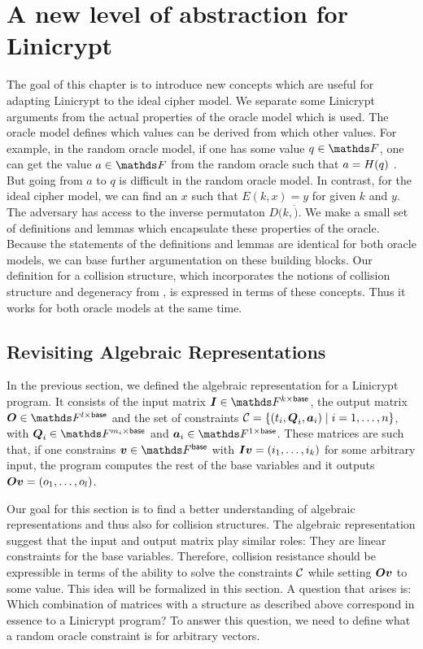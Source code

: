 \chapter{A new level of abstraction for Linicrypt}

The goal of this chapter is to introduce new concepts which are useful for adapting Linicrypt to the ideal cipher model.
We separate some Linicrypt arguments from the actual properties of the oracle model which is used.
The oracle model defines which values can be derived from which other values.
For example, in the random oracle model, if one has some value $q \in \F$, one can get the value $a \in \F$ from the random oracle such that $a = H(q)$ .
But going from $a$ to $q$ is difficult in the random oracle model.
In contrast, for the ideal cipher model, we can find an $x$ such that $E(k,x) = y$ for given $k$ and $y$.
The adversary has access to the inverse permutaton $D(k, \ddot)$.
We make a small set of definitions and lemmas which encapsulate these properties of the oracle.
Because the statements of the definitions and lemmas are identical for both oracle models,
we can base further argumentation on these building blocks.
Our definition for a collision structure,
which incorporates the notions of collision structure and degeneracy from \cite{TCC:McQSwoRos19},
is expressed in terms of these concepts.
Thus it works for both oracle models at the same time.

\section{Revisiting Algebraic Representations}
\label{chapter:revisiting_algebraic_representations}

In the previous section, we defined the algebraic representation for a Linicrypt program.
It consists of the input matrix $\Inp \in \F^{k \times \base}$,
the output matrix $\O \in \F^{l \times \base}$
and the set of constraints $\mathcal{C} = \{ (t_i, \boldsymbol{Q}_i, \boldsymbol a_i) \mid i = 1, \dots, n \}$,
with $\Q_i \in \F^{m_i \times \base}$ and $\va_i \in \F^{1 \times \base}$.
These matrices are such that,
if one constrains $\vbase \in \Fsp$ with $\boldsymbol{I}\boldsymbol v = (i_1, \dots, i_{k})$ for some arbitrary input,
the program computes the rest of the base variables and it outputs $\boldsymbol{O} \boldsymbol v = (o_1, \dots, o_{l})$.

Our goal for this section is to find a better understanding of algebraic representations and thus also for collision structures.
The algebraic representation suggest
that the input and output matrix play similar roles:
They are linear constraints for the base variables. 
Therefore, collision resistance should be expressible in terms of the ability to solve the constraints $\mathcal{C}$ while setting $\boldsymbol{O}\boldsymbol v$ to some value.  
This idea will be formalized in this section.
A question that arises is:
Which combination of matrices with a structure as described above correspond in essence to a Linicrypt program?
To answer this question,
we need to define what a random oracle constraint is for arbitrary vectors.

